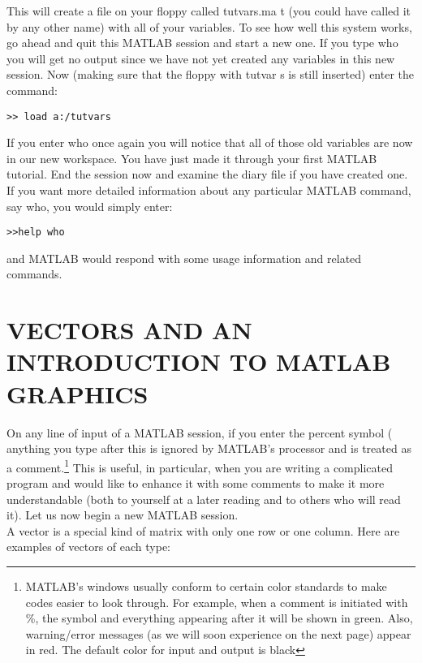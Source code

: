 \documentclass[../main.tex]{subfiles}
\begin{document}
\noindent This will create a file on your floppy called tutvars.ma t (you could have
called it by any other name) with all of your variables. To see how well this
system works, go ahead and quit this MATLAB session and start a new one. If
you type who you will get no output since we have not yet created any variables in
this new session. Now (making sure that the floppy with tutvar s is still
inserted) enter the command: 

\begin{verbatim}
>> load a:/tutvars  
\end{verbatim}

\noindent If you enter who once again you will notice that all of those old variables are now
in our new workspace. You have just made it through your first MATLAB
tutorial. End the session now and examine the diary file if you have created one. \\

If you want more detailed information about any particular MATLAB command,
say who, you would simply enter: 

\begin{verbatim}
>>help who 
\end{verbatim}

\noindent and MATLAB would respond with some usage information and related
commands.

\section{VECTORS AND AN INTRODUCTION TO MATLAB GRAPHICS}

\noindent On any line of input of a MATLAB session, if you enter the percent symbol (%
anything you type after this is ignored by MATLAB's processor and is treated as a
comment.\footnote[4]{MATLAB's windows usually conform to certain color standards to make codes easier to look
through. For example, when a comment is initiated with \%, the symbol and everything appearing after
it will be shown in green. Also, warning/error messages (as we will soon experience on the next page)
appear in red. The default color for input and output is black}
 This is useful, in particular, when you are writing a complicated
program and would like to enhance it with some comments to make it more
understandable (both to yourself at a later reading and to others who will read it).
Let us now begin a new MATLAB session.\\

A vector is a special kind of matrix with only one row or one column. Here are
examples of vectors of each type: 
\end{document}
